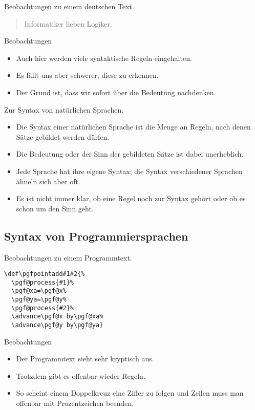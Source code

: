 \begin{frame}{Beobachtungen zu einem deutschen Text.}
  \begin{quotation}
    Informatiker lieben Logiker.
  \end{quotation}

  \bigskip
  \begin{block}{Beobachtungen}
    \begin{itemize}
    \item Auch hier werden viele syntaktische Regeln eingehalten.
    \item Es fällt uns aber \alert{schwerer}, diese zu erkennen.
    \item Der Grund ist, dass wir \alert{sofort über die Bedeutung
        nachdenken}. 
    \end{itemize}
  \end{block}
\end{frame}

\begin{frame}{Zur Syntax von natürlichen Sprachen.}
  \begin{itemize}
  \item 
    Die \alert{Syntax} einer natürlichen Sprache ist die Menge an
    \alert{Regeln}, nach denen Sätze gebildet werden dürfen. 
  \item 
    Die \alert{Bedeutung} oder der \alert{Sinn} der gebildeten Sätze
    ist dabei unerheblich.
  \item
    Jede Sprache hat ihre eigene Syntax; die Syntax verschiedener
    Sprachen ähneln sich aber oft.
  \item
    Es ist nicht immer klar, ob eine Regel noch zur Syntax gehört
    oder ob es schon um den Sinn geht.

  \end{itemize}
\end{frame}

\subsection{Syntax von Programmiersprachen}

\begin{frame}[fragile]{Beobachtungen zu einem Programmtext.}
  
\begin{verbatim}
\def\pgfpointadd#1#2{%
  \pgf@process{#1}%
  \pgf@xa=\pgf@x%
  \pgf@ya=\pgf@y%
  \pgf@process{#2}%
  \advance\pgf@x by\pgf@xa%
  \advance\pgf@y by\pgf@ya}
\end{verbatim}
  \begin{block}{Beobachtungen}
    \begin{itemize}
    \item Der Programmtext sieht sehr kryptisch aus.
    \item Trotzdem gibt es offenbar wieder Regeln.
    \item So scheint einem Doppelkreuz eine Ziffer zu folgen und
      Zeilen muss man offenbar mit Prozentzeichen beenden.
    \end{itemize}
  \end{block}
\end{frame}


